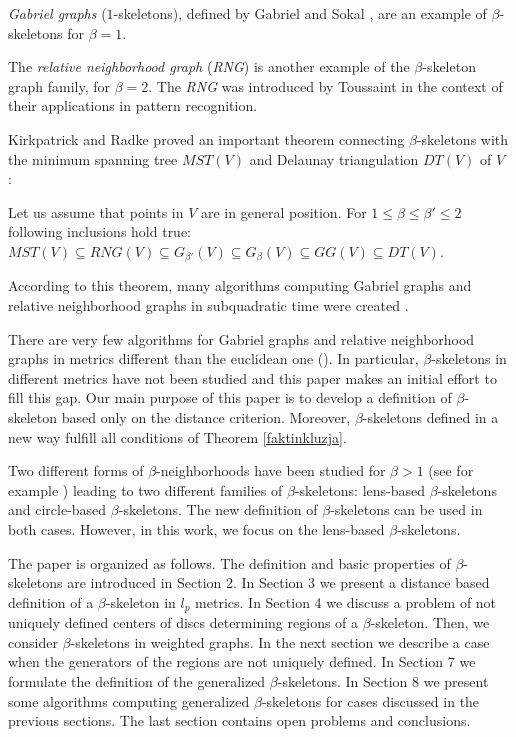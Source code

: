 \documentclass[11pt]{llncs}
\begin{document}
{\em Gabriel graphs} ($1$-skeletons), 
defined by Gabriel and Sokal \cite{gs69}, are an example of $\beta$-skeletons for $\beta=1$.


The {\em relative neighborhood graph} (\textit{RNG}) is  another example of the $\beta$-skeleton
graph family, for $\beta=2$. The \textit{RNG} was 
introduced by Toussaint \cite{tou80} in the context of their applications in pattern 
recognition. 

Kirkpatrick and Radke \cite{kr85} proved an important theorem connecting $\beta$-skeletons 
with the minimum spanning tree $\mathit{MST}(V)$ and Delaunay triangulation $\mathit{DT}(V)$ of $V$ :

\begin{theorem}
\label{faktinkluzja}
Let us assume that points in $V$ are in general position.
For $1\leq \beta \leq \beta' \leq 2$ following inclusions hold true: 
$\mathit{MST}(V) \subseteq \mathit{RNG}(V) \subseteq G_{\beta'}(V)\subseteq G_{\beta}(V) \subseteq GG(V) 
\subseteq \mathit{DT}(V)$.
\end{theorem}

According to this theorem, many algorithms computing Gabriel graphs and relative neighborhood graphs
in subquadratic time were created \cite{ms84,su83,jk87,jky89,l94}.

There are very few algorithms for Gabriel graphs and relative neighborhood graphs
in metrics different than the euclidean one (\cite{mg11,w06}). In particular, $\beta$-skeletons 
in different metrics have not been studied and this paper makes an initial effort to fill this gap.
Our main purpose of this paper is to develop a definition of $\beta$-skeleton based 
only on the distance criterion.
Moreover, $\beta$-skeletons defined in a new way fulfill all conditions of Theorem \ref{faktinkluzja}.

Two different forms of $\beta$-neighborhoods have been studied for $\beta > 1$
(see for example  \cite{abe98,e02})   
leading to two different families of $\beta$-skeletons: lens-based $\beta$-skeletons 
and circle-based $\beta$-skeletons. 
The new definition of $\beta$-skeletons can be used in both cases. 
However, in this work, we focus on the lens-based $\beta$-skeletons.   

  










The paper is organized as follows.
The definition and basic properties of $\beta$-skeletons are introduced in Section 2. 
In Section 3 we present a distance based definition of a $\beta$-skeleton in $l_p$ metrics. 
In Section 4 we discuss 
a problem of not uniquely defined centers of discs determining regions of a $\beta$-skeleton. 
Then, we consider $\beta$-skeletons in weighted graphs. In the next section we describe a case 
when the generators of the regions are not uniquely defined. In Section 7 we formulate 
the definition of the generalized $\beta$-skeletons. In Section 8 we present some algorithms 
computing generalized $\beta$-skeletons for cases discussed in the previous sections. 
The last section contains open problems and conclusions.
\end{document}
